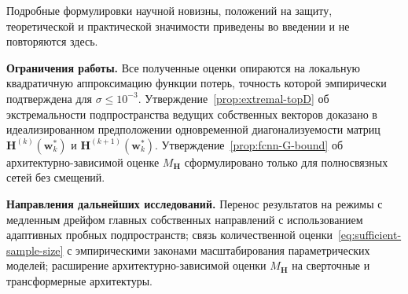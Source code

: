 Подробные формулировки научной новизны, положений на защиту, теоретической и практической значимости приведены во введении и не повторяются здесь.

\textbf{Ограничения работы.} Все полученные оценки опираются на локальную квадратичную аппроксимацию функции потерь, точность которой эмпирически подтверждена для $\sigma \leqslant 10^{-3}$. Утверждение~\ref{prop:extremal-topD} об экстремальности подпространства ведущих собственных векторов доказано в идеализированном предположении одновременной диагонализуемости матриц $\mathbf H^{(k)}(\mathbf w_k^*)$ и $\mathbf H^{(k+1)}(\mathbf w_k^*)$. Утверждение~\ref{prop:fcnn-G-bound} об архитектурно-зависимой оценке $M_{\mathbf H}$ сформулировано только для полносвязных сетей без смещений.

\textbf{Направления дальнейших исследований.} Перенос результатов на режимы с медленным дрейфом главных собственных направлений с использованием адаптивных пробных подпространств; связь количественной оценки~\eqref{eq:sufficient-sample-size} с эмпирическими законами масштабирования параметрических моделей; расширение архитектурно-зависимой оценки $M_{\mathbf H}$ на сверточные и трансформерные архитектуры.
